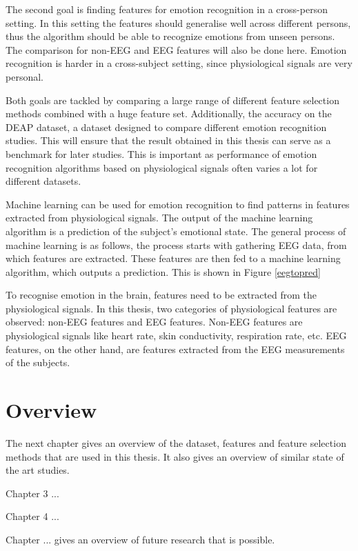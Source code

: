 \npar

The second goal is finding features for emotion recognition in a cross-person setting. In this setting the features should generalise well across different persons, thus the algorithm should be able to recognize emotions from unseen persons. The comparison for non-EEG and EEG features will also be done here. Emotion recognition is harder in a cross-subject setting, since physiological signals are very personal\citep{DEAP}.

\npar 

Both goals are tackled by comparing a large range of different feature selection methods combined with a huge feature set. Additionally, the accuracy on the DEAP dataset, a dataset designed to compare different emotion recognition studies\citep{DEAP}. This will ensure that the result obtained in this thesis can serve as a benchmark for later studies. This is important as performance of emotion recognition algorithms based on physiological signals often varies a lot for different datasets\citep{PhytoEm}.

\npar
Machine learning can be used for emotion recognition to find patterns in features extracted from physiological signals\citep{DEAP,ExtendedPaper}. The output of the machine learning algorithm is a prediction of the subject's emotional state. The general process of machine learning is as follows, the process starts with gathering EEG data, from which features are extracted. These features are then fed to a machine learning algorithm, which outputs a prediction. This is shown in Figure \ref{eegtopred}


To recognise emotion in the brain, features need to be extracted from the physiological signals. In this thesis, two categories of physiological features are observed: non-EEG features and EEG features. Non-EEG features are physiological signals like heart rate, skin conductivity, respiration rate, etc. EEG features, on the other hand, are features extracted from the EEG measurements of the subjects. 

\section{Overview}
The next chapter gives an overview of the dataset, features and feature selection methods that are used in this thesis. It also gives an overview of similar state of the art studies.

\npar

Chapter 3 ...

Chapter 4 ...

Chapter ... gives an overview of future research that is possible.